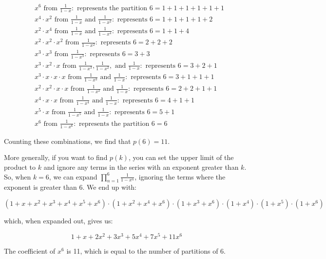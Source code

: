 \documentclass{article}
\theoremstyle{definition}
\begin{document}
\[
\begin{aligned}
&x^6 \text{ from } \frac{1}{1-x}: \text{ represents the partition } 6 = 1+1+1+1+1+1 \\
&x^4 \cdot x^2 \text{ from } \frac{1}{1-x} \text{ and } \frac{1}{1-x^2}: \text{ represents } 6 = 1+1+1+1+2 \\
&x^2 \cdot x^4 \text{ from } \frac{1}{1-x} \text{ and } \frac{1}{1-x^4}: \text{ represents } 6 = 1+1+4 \\
&x^2 \cdot x^2 \cdot x^2 \text{ from } \frac{1}{1-x^2}: \text{ represents } 6 = 2+2+2 \\
&x^3 \cdot x^3 \text{ from } \frac{1}{1-x^3}: \text{ represents } 6 = 3+3 \\
&x^3 \cdot x^2 \cdot x \text{ from } \frac{1}{1-x^3}, \frac{1}{1-x^2}, \text{ and } \frac{1}{1-x}: \text{ represents } 6 = 3+2+1 \\
&x^3 \cdot x \cdot x \cdot x \text{ from } \frac{1}{1-x^3} \text{ and } \frac{1}{1-x}: \text{ represents } 6 = 3+1+1+1 \\
&x^2 \cdot x^2 \cdot x \cdot x \text{ from } \frac{1}{1-x^2} \text{ and } \frac{1}{1-x}: \text{ represents } 6 = 2+2+1+1 \\
&x^4 \cdot x \cdot x \text{ from } \frac{1}{1-x^4} \text{ and } \frac{1}{1-x}: \text{ represents } 6 = 4+1+1 \\
&x^5 \cdot x \text{ from } \frac{1}{1-x^5} \text{ and } \frac{1}{1-x}: \text{ represents } 6 = 5+1 \\
&x^6 \text{ from } \frac{1}{1-x^6}: \text{ represents the partition } 6 = 6
\end{aligned}
\]

\noindent
Counting these combinations, we find that \( p(6) = 11 \).

\noindent
More generally, if you want to find $p(k)$, you can set the upper limit of the product to $k$ and ignore
any terms in the series with an exponent greater than $k$. So, when $k = 6$, we can expand
$\prod_{n=1}^{6} \frac{1}{1-x^n}$, ignoring the terms where the exponent is greater than 6. We end up with:

\[
(1 + x + x^2 + x^3 + x^4 + x^5 + x^6) \cdot (1 + x^2 + x^4 + x^6) \cdot (1 + x^3 + x^6) \cdot (1 + x^4) \cdot 
(1 + x^5) \cdot (1 + x^6)
\]

\noindent
which, when expanded out, gives us:

\[
1 + x + 2x^2 + 3x^3 + 5x^4 + 7x^5 + 11x^6
\]

\noindent
The coefficient of $x^6$ is 11, which is equal to the number of partitions of 6.
\end{document}
